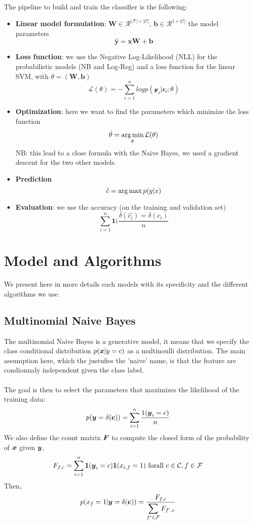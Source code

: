 \documentclass[11pt]{article}
\begin{document}
\noindent The pipeline to build and train the classifier is the following:
\begin{itemize}
	\item \textbf{Linear model formulation}: $\mathbf{W} \in \mathcal{R}^{|\mathcal{F}| \times |\mathcal{C}|}$, $\mathbf{b} \in \mathcal{R}^{1 \times |\mathcal{C}|}$ the model parameters
	\[ \mathbf{\hat{y}} = \mathbf{xW} + \mathbf{b} \]
	\item \textbf{Loss function}: we use the Negative Log-Likelihood (NLL) for the probabilistic models (NB and Log-Reg) and a loss function for the linear SVM, with $ \theta = (\mathbf{W}, \mathbf{b})$
	\[\mathcal{L}(\theta) = - \sum_{i=1}^{n} log p(\mathcal{y_i}| \mathcal{x_i}; \theta) \]
	\item \textbf{Optimization}: here we want to find the parameters which minimize the loss function
	\[ \hat{\theta} = \argmin_{\theta}{\mathcal{L}(\theta)} \]
	NB: this lead to a close formula with the Naive Bayes, we used a gradient descent for the two other models.
	\item \textbf{Prediction}
	\[\hat{c} = \argmax{p(y|x)} \]
	\item \textbf{Evaluation}: we use the accuracy (on the training and validation set)
	\[ \sum_{i = 1}^{n} \mathbf{1}(\frac{\delta(\hat{c_i}) = \delta(c_i)}{n} \]
\end{itemize}



\section{Model and Algorithms}

We present here in more details each models with its specificity and the different algorithms we use.

\subsection{Multinomial Naive Bayes}

The multinomial Naive Bayes is a generative model, it means that we specify the class conditional distribution $p(\boldsymbol{x} | y=c)$ as a multinoulli distribution. The main assumption here, which the justufies the 'naive' name, is that the feature are condionnaly independent given the class label.\\ \\
The goal is then to select the parameters that maximizes the likelihood of the training data:
    \[p(\boldsymbol{y} = \mathbf{\delta(c)}) = \sum_{i = 1}^n \frac{1(\boldsymbol{y}_i = c)}{n}\]
We also define the count matrix $\boldsymbol{F}$ to compute the closed form of the probability of $\boldsymbol{x}$ given $\boldsymbol{y}$,
\[F_{f,c} = \sum_{i = 1}^n \mathbf{1}(\boldsymbol{y}_i = c) \mathbf{1}(x_{i, f} = 1) \mathrm{\ for all\ } c\in \mathcal{C}, f\in \mathcal{F}\] 
Then,
      \[p(x_f = 1 | \boldsymbol{y}=\mathbf{\delta(c)}) = \frac{F_{f, c}}{\displaystyle \sum_{f' \in \mathcal{F}} F_{f',c}}  \]
\end{document}
